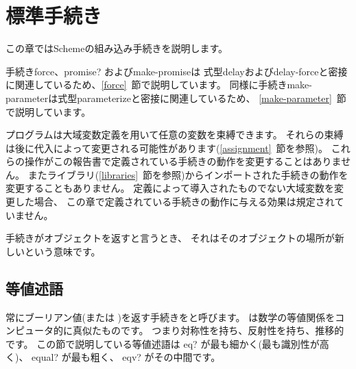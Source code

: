 
\chapter{標準手続き}
\label{initialenv}
\label{builtinchapter}


この章ではSchemeの組み込み手続きを説明します。

手続き{\cf force}、{\cf promise?} および{\cf make-promise}は
式型{\cf delay}および{\cf delay-force}と密接に関連しているため、\ref{force}~節で説明しています。
同様に手続き{\cf make-\+parameter}は式型{\cf parameterize}と密接に関連しているため、
\ref{make-parameter}~節で説明しています。

プログラムは大域変数定義を用いて任意の変数を束縛できます。
それらの束縛は後に代入によって変更される可能性があります(\ref{assignment}~節を参照)。
これらの操作がこの報告書で定義されている手続きの動作を変更することはありません。
またライブラリ(\ref{libraries}~節を参照)からインポートされた手続きの動作を変更することもありません。
定義によって導入されたものでない大域変数を変更した場合、
この章で定義されている手続きの動作に与える効果は規定されていません。

手続きがオブジェクトを返すと言うとき、
それはそのオブジェクトの場所が新しいという意味です。

\section{等値述語}
\label{equivalencesection}

常にブーリアン値(\schtrue{}または \schfalse)を返す手続きをと呼びます。
は数学の等値関係をコンピュータ的に真似たものです。
つまり対称性を持ち、反射性を持ち、推移的です。
この節で説明している等値述語は
{\cf eq?} が最も細かく(最も識別性が高く)、
{\cf equal?} が最も粗く、
{\cf eqv?} がその中間です。


